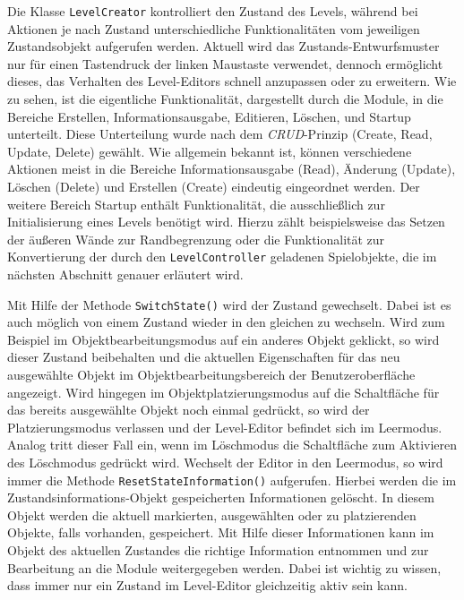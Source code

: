 Die Klasse \texttt{LevelCreator} kontrolliert den Zustand des Levels, während bei Aktionen je nach Zustand unterschiedliche Funktionalitäten vom jeweiligen Zustandsobjekt aufgerufen werden. Aktuell wird das Zustands-Entwurfsmuster nur für einen Tastendruck der linken Maustaste verwendet, dennoch ermöglicht dieses, das Verhalten des Level-Editors schnell anzupassen oder zu erweitern. Wie zu sehen, ist die eigentliche Funktionalität, dargestellt durch die Module, in die Bereiche Erstellen, Informationsausgabe, Editieren, Löschen, und Startup unterteilt. Diese Unterteilung wurde nach dem \textit{CRUD}-Prinzip\cite{Torim.2012} (Create, Read, Update, Delete) gewählt. Wie allgemein bekannt ist, können verschiedene Aktionen meist in die Bereiche Informationsausgabe (Read), Änderung (Update), Löschen (Delete) und Erstellen (Create) eindeutig eingeordnet werden. Der weitere Bereich Startup enthält Funktionalität, die ausschließlich zur Initialisierung eines Levels benötigt wird. Hierzu zählt beispielsweise das Setzen der äußeren Wände zur Randbegrenzung oder die Funktionalität zur Konvertierung der durch den \texttt{LevelController} geladenen Spielobjekte, die im nächsten Abschnitt genauer erläutert wird. 

Mit Hilfe der Methode \texttt{SwitchState()} wird der Zustand gewechselt. Dabei ist es auch möglich von einem Zustand wieder in den gleichen zu wechseln. Wird zum Beispiel im Objektbearbeitungsmodus auf ein anderes Objekt geklickt, so wird dieser Zustand beibehalten und die aktuellen Eigenschaften für das neu ausgewählte Objekt im Objektbearbeitungsbereich der Benutzeroberfläche angezeigt. Wird hingegen im Objektplatzierungsmodus auf die Schaltfläche für das bereits ausgewählte Objekt noch einmal gedrückt, so wird der Platzierungsmodus verlassen  und der Level-Editor befindet sich im Leermodus. Analog tritt dieser Fall ein, wenn im Löschmodus die Schaltfläche zum Aktivieren des Löschmodus gedrückt wird. Wechselt der Editor in den Leermodus, so wird immer die Methode \texttt{ResetStateInformation()} aufgerufen. Hierbei werden die im Zustandsinformations-Objekt gespeicherten Informationen gelöscht. In diesem Objekt werden die aktuell markierten, ausgewählten oder zu platzierenden Objekte, falls vorhanden, gespeichert. Mit Hilfe dieser Informationen kann im Objekt des aktuellen Zustandes die richtige Information entnommen und zur Bearbeitung an die Module weitergegeben werden. Dabei ist wichtig zu wissen, dass immer nur ein Zustand im Level-Editor gleichzeitig aktiv sein kann.
 

